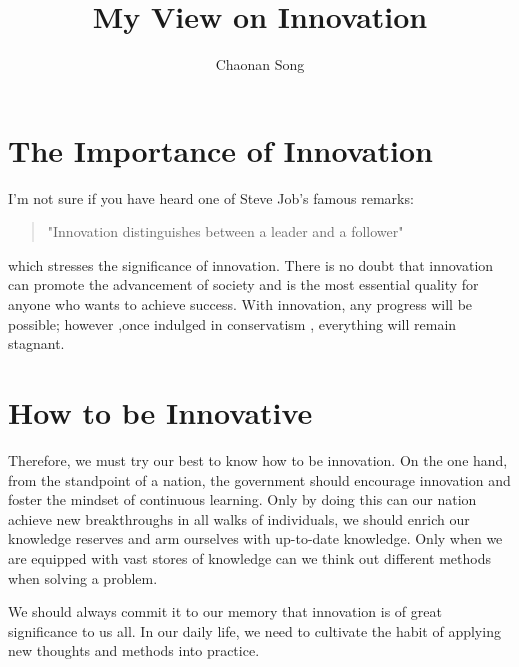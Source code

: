 \documentclass{ctexart}
\title{My View on Innovation}
\author{Chaonan Song}
\begin{document}
\maketitle
\section{The Importance of Innovation}
\par I'm not sure if you have heard one of Steve Job's famous remarks:
\begin{quote}
"Innovation distinguishes between a leader and a follower"
\end{quote} which stresses the significance of innovation. There is no doubt that innovation can promote the advancement of society and is the most essential quality for anyone who wants to achieve success. With innovation, any progress will be possible; however ,once indulged in conservatism , everything will remain stagnant.
\section{How to be Innovative}
\par Therefore, we must try our best to know how to be innovation. On the one hand, from the standpoint of a nation, the government should encourage innovation and foster the mindset of continuous learning. Only by doing this can our nation achieve new breakthroughs in all walks of individuals, we should enrich our knowledge reserves and arm ourselves with up-to-date knowledge. Only when we are equipped with vast stores of knowledge can we think out different methods when solving a problem.
\par We should always commit it to our memory that innovation is of great significance to us all. In our daily life, we need to cultivate the habit of applying new thoughts and methods into practice.
\end{document}

